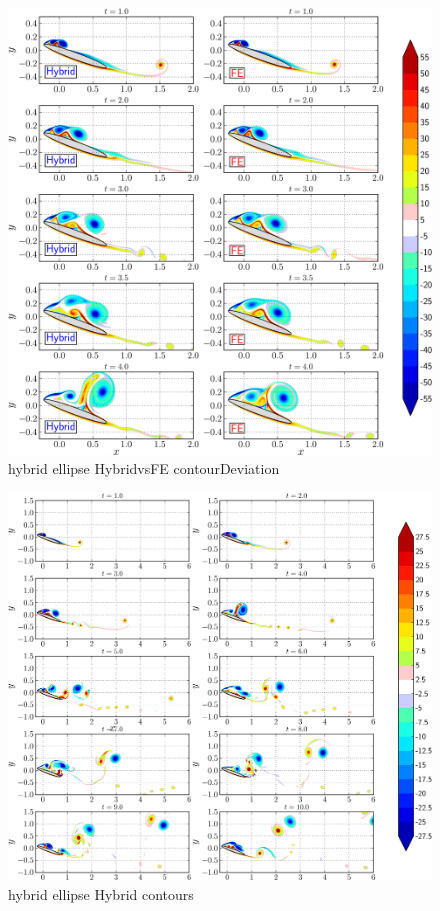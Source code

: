 	\begin{figure}[!p]
	\showthe\columnwidth
	\centering
	\includegraphics[width=\linewidth]{./figures/hybrid/ellipse/hybrid_ellipse_HybridvsFE_contourDeviation_compressed-crop.png}
	\caption{hybrid ellipse HybridvsFE contourDeviation}
	\label{fig:hybrid_ellipse_HybridvsFE_contourDeviation}
	\end{figure}

	\begin{figure}[!p]
	\showthe\columnwidth
	\centering
	\includegraphics[width=\linewidth]{./figures/hybrid/ellipse/hybrid_ellipse_Hybrid_contours_compressed-crop.png}
	\caption{hybrid ellipse Hybrid contours}
	\label{fig:hybrid_ellipse_Hybrid_contours}
	\end{figure}

